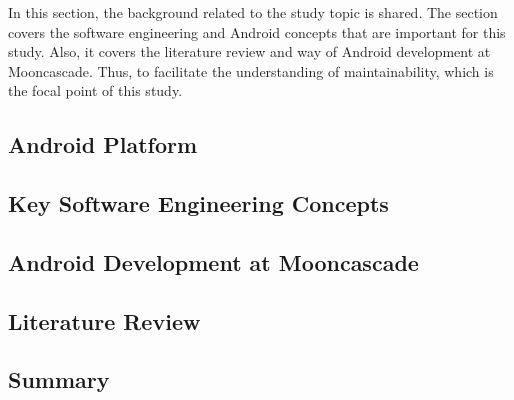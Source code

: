 In this section, the background related to the study topic is shared. The section covers the software engineering and Android concepts that are important for this study. Also, it covers the literature review and way of Android development at Mooncascade. Thus, to facilitate the understanding of maintainability, which is the focal point of this study.

\subsection{Android Platform}


\subsection{Key Software Engineering Concepts}


\subsection{Android Development at Mooncascade}
\label{section:2.3}


\subsection{Literature Review}


\subsection{Summary}





